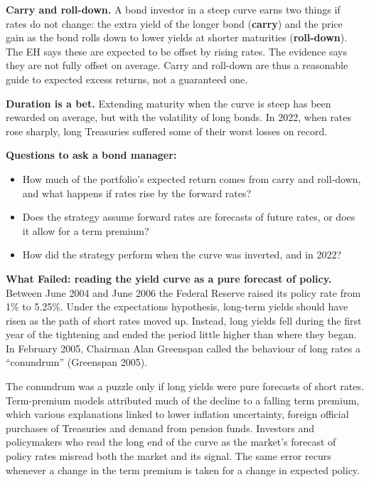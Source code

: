 \textbf{Carry and roll-down.} A bond investor in a steep curve earns two things if rates do not change: the extra yield of the longer bond (\textbf{carry}) and the price gain as the bond rolls down to lower yields at shorter maturities (\textbf{roll-down}). The EH says these are expected to be offset by rising rates. The evidence says they are not fully offset on average. Carry and roll-down are thus a reasonable guide to expected excess returns, not a guaranteed one.

\textbf{Duration is a bet.} Extending maturity when the curve is steep has been rewarded on average, but with the volatility of long bonds. In 2022, when rates rose sharply, long Treasuries suffered some of their worst losses on record.

\textbf{Questions to ask a bond manager:}

\begin{itemize}
  \item How much of the portfolio's expected return comes from carry and roll-down, and what happens if rates rise by the forward rates?
  \item Does the strategy assume forward rates are forecasts of future rates, or does it allow for a term premium?
  \item How did the strategy perform when the curve was inverted, and in 2022?
\end{itemize}

\begin{callout}
\textbf{What Failed: reading the yield curve as a pure forecast of policy.} Between June 2004 and June 2006 the Federal Reserve raised its policy rate from 1\% to 5.25\%. Under the expectations hypothesis, long-term yields should have risen as the path of short rates moved up. Instead, long yields fell during the first year of the tightening and ended the period little higher than where they began. In February 2005, Chairman Alan Greenspan called the behaviour of long rates a ``conundrum'' (Greenspan 2005).

The conundrum was a puzzle only if long yields were pure forecasts of short rates. Term-premium models attributed much of the decline to a falling term premium, which various explanations linked to lower inflation uncertainty, foreign official purchases of Treasuries and demand from pension funds. Investors and policymakers who read the long end of the curve as the market's forecast of policy rates misread both the market and its signal. The same error recurs whenever a change in the term premium is taken for a change in expected policy.
\end{callout}

